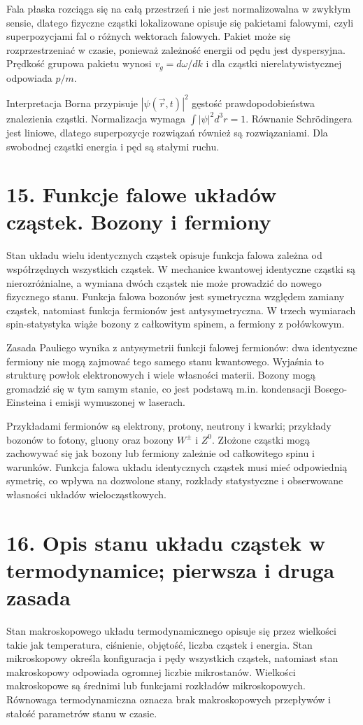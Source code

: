 \documentclass[11pt,a4paper,oneside]{report}
\begin{document}
Fala płaska rozciąga się na całą przestrzeń i nie jest normalizowalna w zwykłym sensie, dlatego fizyczne cząstki lokalizowane opisuje się pakietami falowymi, czyli superpozycjami fal o różnych wektorach falowych. Pakiet może się rozprzestrzeniać w czasie, ponieważ zależność energii od pędu jest dyspersyjna. Prędkość grupowa pakietu wynosi \(v_g=d\omega/dk\) i dla cząstki nierelatywistycznej odpowiada \(p/m\).

Interpretacja Borna przypisuje \(|\psi(\vec r,t)|^2\) gęstość prawdopodobieństwa znalezienia cząstki. Normalizacja wymaga \(\int|\psi|^2d^3r=1\). Równanie Schrödingera jest liniowe, dlatego superpozycje rozwiązań również są rozwiązaniami. Dla swobodnej cząstki energia i pęd są stałymi ruchu.

\section{15. Funkcje falowe układów cząstek. Bozony i fermiony}
Stan układu wielu identycznych cząstek opisuje funkcja falowa zależna od współrzędnych wszystkich cząstek. W mechanice kwantowej identyczne cząstki są nierozróżnialne, a wymiana dwóch cząstek nie może prowadzić do nowego fizycznego stanu. Funkcja falowa bozonów jest symetryczna względem zamiany cząstek, natomiast funkcja fermionów jest antysymetryczna. W trzech wymiarach spin-statystyka wiąże bozony z całkowitym spinem, a fermiony z połówkowym.

Zasada Pauliego wynika z antysymetrii funkcji falowej fermionów: dwa identyczne fermiony nie mogą zajmować tego samego stanu kwantowego. Wyjaśnia to strukturę powłok elektronowych i wiele własności materii. Bozony mogą gromadzić się w tym samym stanie, co jest podstawą m.in. kondensacji Bosego-Einsteina i emisji wymuszonej w laserach.

Przykładami fermionów są elektrony, protony, neutrony i kwarki; przykłady bozonów to fotony, gluony oraz bozony \(W^\pm\) i \(Z^0\). Złożone cząstki mogą zachowywać się jak bozony lub fermiony zależnie od całkowitego spinu i warunków. Funkcja falowa układu identycznych cząstek musi mieć odpowiednią symetrię, co wpływa na dozwolone stany, rozkłady statystyczne i obserwowane własności układów wielocząstkowych.

\section{16. Opis stanu układu cząstek w termodynamice; pierwsza i druga zasada}
Stan makroskopowego układu termodynamicznego opisuje się przez wielkości takie jak temperatura, ciśnienie, objętość, liczba cząstek i energia. Stan mikroskopowy określa konfiguracja i pędy wszystkich cząstek, natomiast stan makroskopowy odpowiada ogromnej liczbie mikrostanów. Wielkości makroskopowe są średnimi lub funkcjami rozkładów mikroskopowych. Równowaga termodynamiczna oznacza brak makroskopowych przepływów i stałość parametrów stanu w czasie.
\end{document}

